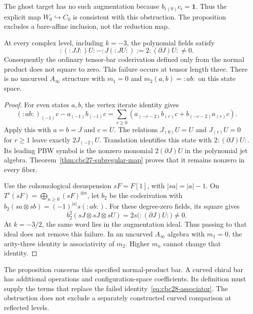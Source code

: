 The ghost target has no such augmentation because $b_i{}_{(0)}c_i=\mathbf1$.
Thus the explicit map $W_0\hookrightarrow C_0$ is consistent with this obstruction.
The proposition excludes a bare-affine inclusion, not the reduction map.

\begin{proposition}\label{prop:cbc28-bar-obstruction}
At every complex level, including $k=-3$, the polynomial fields satisfy
\begin{equation}\label{eq:cbc28-associator}
 :(:JJ:)U:-:J(:JU:):=2:(\partial J)U:\ne0.
\end{equation}
Consequently the ordinary tensor-bar coderivation defined only from the normal product does not square to zero.
This failure occurs at tensor length three.
There is no uncurved $A_\infty$ structure with $m_1=0$ and $m_2(a,b)=:ab:$ on this state space.
\end{proposition}
\begin{proof}
For even states $a,b$, the vertex iterate identity gives
\[
 (:ab:)_{(-1)}c-a_{(-1)}b_{(-1)}c
 =\sum_{r\geq0}\left(a_{(-r-2)}b_{(r)}c+b_{(-r-2)}a_{(r)}c\right).
\]
Apply this with $a=b=J$ and $c=U$.
The relations $J_{(0)}U=U$ and $J_{(r)}U=0$ for $r\geq1$ leave exactly $2J_{(-2)}U$.
Translation identifies this state with $2:(\partial J)U:$.
Its leading PBW symbol is the nonzero monomial $2(\partial J)U$ in the polynomial jet algebra.
Theorem~\ref{thm:cbc27-subregular-map} proves that it remains nonzero in every fiber.

Use the cohomological desuspension $sF=F[1]$, with $|sa|=|a|-1$.
On $T^c(sF)=\bigoplus_{n\geq0}(sF)^{\otimes n}$, let $b_2$ be the coderivation with
$b_2(sa\otimes sb)=(-1)^{|a|}s(:ab:)$.
For these degree-zero fields, its square gives
\[
 b_2^2(sJ\otimes sJ\otimes sU)=2s\bigl(:(\partial J)U:\bigr)\ne0.
\]
At $k=-3/2$, the same word lies in the augmentation ideal.
Thus passing to that ideal does not remove this failure.
In an uncurved $A_\infty$ algebra with $m_1=0$, the arity-three identity is associativity of $m_2$.
Higher $m_n$ cannot change that identity.
\end{proof}

The proposition concerns this specified normal-product bar.
A curved chiral bar has additional operations and configuration-space coefficients.
Its definition must supply the terms that replace the failed identity~\eqref{eq:cbc28-associator}.
The obstruction does not exclude a separately constructed curved comparison at reflected levels.

